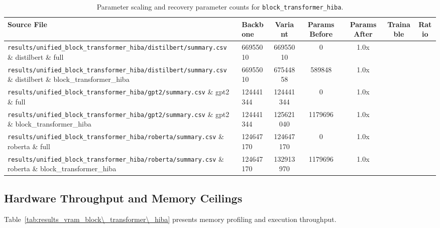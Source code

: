 \begin{table}[t]
\centering
\small
\begin{tabularx}{\linewidth}{llccccc}
\toprule
\textbf{Source File} & \textbf{Backbone} & \textbf{Variant} & \textbf{Params Before} & \textbf{Params After} & \textbf{Trainable} & \textbf{Ratio} \\
\midrule
\texttt{results/unified\_block\_transformer\_hiba/distilbert/summary.csv} \& distilbert \& full & 66955010 & 66955010 & 0 & 1.0x \\
\texttt{results/unified\_block\_transformer\_hiba/distilbert/summary.csv} \& distilbert \& block\_transformer\_hiba & 66955010 & 67544858 & 589848 & 1.0x \\
\texttt{results/unified\_block\_transformer\_hiba/gpt2/summary.csv} \& gpt2 \& full & 124441344 & 124441344 & 0 & 1.0x \\
\texttt{results/unified\_block\_transformer\_hiba/gpt2/summary.csv} \& gpt2 \& block\_transformer\_hiba & 124441344 & 125621040 & 1179696 & 1.0x \\
\texttt{results/unified\_block\_transformer\_hiba/roberta/summary.csv} \& roberta \& full & 124647170 & 124647170 & 0 & 1.0x \\
\texttt{results/unified\_block\_transformer\_hiba/roberta/summary.csv} \& roberta \& block\_transformer\_hiba & 124647170 & 132913970 & 1179696 & 1.0x \\
\bottomrule
\end{tabularx}
\caption{Parameter scaling and recovery parameter counts for \texttt{block\_transformer\_hiba}.}
\label{tab:results_params_block\_transformer\_hiba}
\end{table}

\subsection{Hardware Throughput and Memory Ceilings}
Table~\ref{tab:results_vram_block\_transformer\_hiba} presents memory profiling and execution throughput.

